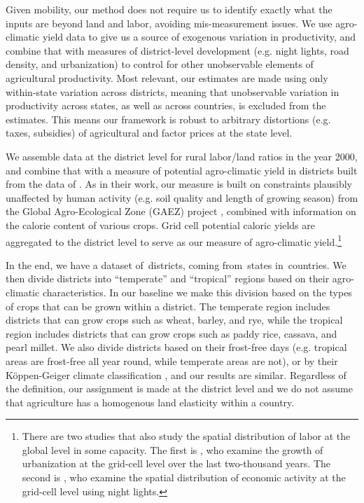 \documentclass[12pt]{article}
\begin{document}
Given mobility, our method does not require us to identify exactly what the inputs are beyond land and labor, avoiding mis-measurement issues. We use agro-climatic yield data to give us a source of exogenous variation in productivity, and combine that with measures of district-level development (e.g. night lights, road density, and urbanization) to control for other unobservable elements of agricultural productivity. Most relevant, our estimates are made using only within-state variation across districts, meaning that unobservable variation in productivity across states, as well as across countries, is excluded from the estimates. This means our framework is robust to arbitrary distortions (e.g. taxes, subsidies) of agricultural and factor prices at the state level.

We assemble data at the district level for rural labor/land ratios in the year 2000, and combine that with a measure of potential agro-climatic yield in districts built from the data of \citet{galorozak2016}. As in their work, our measure is built on constraints plausibly unaffected by human activity (e.g. soil quality and length of growing season) from the Global Agro-Ecological Zone (GAEZ) project \citep{gaez}, combined with information on the calorie content of various crops. Grid cell potential caloric yields are aggregated to the district level to serve as our measure of agro-climatic yield.\footnote{There are two studies that also study the spatial distribution of labor at the global level in some capacity. The first is \citet{mfm2014}, who examine the growth of urbanization at the grid-cell level over the last two-thousand years. The second is \citet{hssw2016}, who examine the spatial distribution of economic activity at the grid-cell level using night lights.}

In the end, we have a dataset of\districts \ districts, coming from\provinces \ states in\countries \ countries. We then divide districts into ``temperate'' and ``tropical'' regions based on their agro-climatic characteristics. In our baseline we make this division based on the types of crops that can be grown within a district. The temperate region includes districts that can grow crops such as wheat, barley, and rye, while the tropical region includes districts that can grow crops such as paddy rice, cassava, and pearl millet. We also divide districts based on their frost-free days (e.g. tropical areas are frost-free all year round, while temperate areas are not), or by their K{\"o}ppen-Geiger climate classification \citep{kottek2006}, and our results are similar. Regardless of the definition, our assignment is made at the district level and we do not assume that agriculture has a homogenous land elasticity within a country. 
\end{document}
